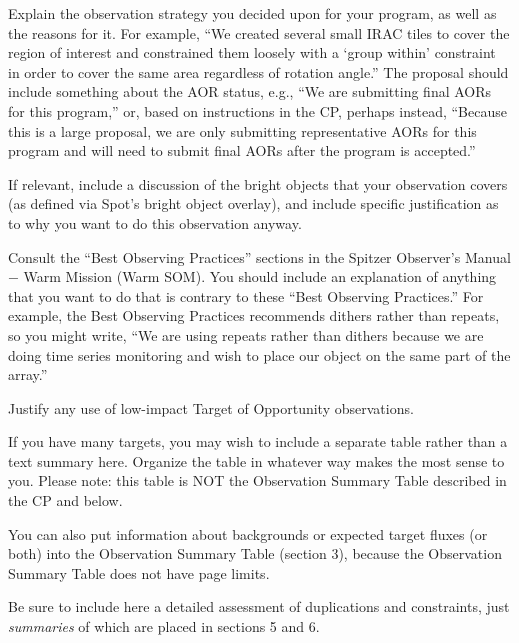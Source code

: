 \documentclass[letterpaper,12pt]{article}
\begin{document}
Explain the observation strategy you decided upon for your
program, as well as the reasons for it.  For example, ``We
created several small IRAC tiles to cover the region of
interest and constrained them loosely with a `group within'
constraint in order to cover the same area regardless of
rotation angle.''  The proposal should include something about
the AOR status, e.g., ``We are submitting final AORs for this
program,''  or, based on instructions in the CP, perhaps
instead, ``Because this is a large proposal, we are only
submitting representative AORs for this program and will need to
submit final AORs after the program is accepted.'' \newline

If relevant, include a discussion of the bright objects that
your observation covers (as defined via Spot's bright object
overlay), and include specific justification as to why you
want to do this observation anyway.\newline

Consult the ``Best Observing
Practices'' sections in the Spitzer Observer's Manual $-$ Warm Mission
(Warm SOM). You should include an explanation of anything that you 
want to do that is contrary to these ``Best Observing Practices.''  For
example, the Best Observing Practices recommends dithers rather
than repeats, so you might write, ``We are using 
repeats rather than dithers because we are doing time series
monitoring and wish to place our object on the same part of the
array.''\newline

Justify any use of low-impact Target of Opportunity observations. \newline

If you have many targets, you may wish to include a separate 
table rather than a text summary here. Organize the
table in whatever way makes the most sense to you.   
Please note: this table is NOT the Observation
Summary Table described in the CP and below.  \newline

You can also put information about backgrounds or expected target 
fluxes (or both) into the Observation Summary Table (section
3), because the Observation Summary Table does not have page
limits.  \newline

Be sure to include here a detailed assessment of duplications and 
constraints, just {\em summaries} of which are placed in
sections 5 and 6.\newline
\end{document}
